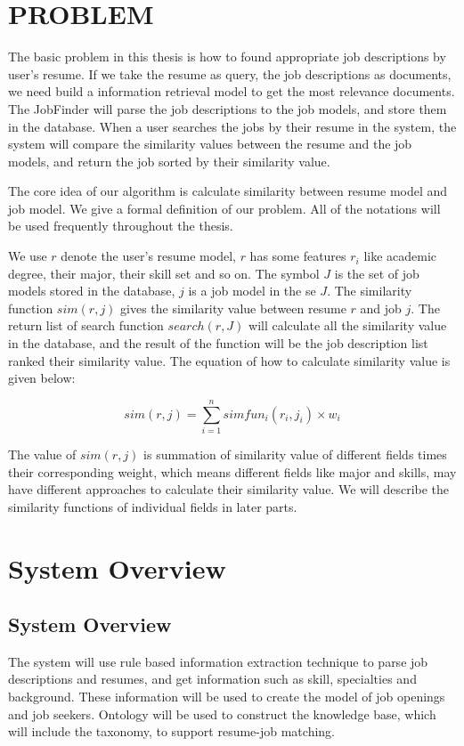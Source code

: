 \chapter{PROBLEM}

The basic problem in this thesis is how to found appropriate job descriptions by user's resume. If we take the resume as query, the job descriptions as documents, we need build a information retrieval model to get the most relevance documents.  The JobFinder will parse the job descriptions to the job models, and store them in the database. When a user searches the jobs by their resume in the system, the system will compare the similarity values between the resume and the job models, and return the job sorted by their similarity value.

The core idea of our algorithm is calculate similarity between resume model and job model.
We give a formal definition of our problem. All of the notations will be used frequently throughout the thesis.

We use $r$ denote the user's resume model, $r$ has some features $r_i$ like academic degree, their major, their skill set and so on. The symbol $J$ is the set of job models stored in the database, $j$ is a job model in the se $J$. The similarity function $sim(r, j)$ gives the similarity value between resume $r$ and job $j$. The return list of search function $search(r,J)$ will calculate all the similarity value in the database, and the result of the function will be the job description list ranked their similarity value. The equation of how to calculate similarity value is given below:

$$ sim(r, j) = \sum_{i=1}^{n} simfun_i(r_i,j_i) \times w_i $$

The value of $sim(r, j)$ is summation of similarity value of different fields times their corresponding weight, which means different fields like major and skills,  may have different approaches to calculate their similarity value. We will describe the similarity functions of individual fields in later parts.

\chapter{System Overview}

\section{System Overview}
The system will use rule based information extraction technique to parse job descriptions and resumes, and get information such as skill, specialties and background. These information will be used to create the model of job openings and job seekers. Ontology will be used to construct the knowledge base, which will include the taxonomy, to support resume-job matching.

